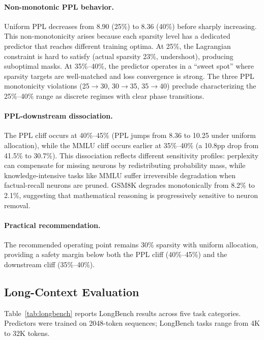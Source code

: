 \documentclass[11pt,a4paper]{article}
\begin{document}
\paragraph{Non-monotonic PPL behavior.} Uniform PPL decreases from 8.90 (25\%) to 8.36 (40\%) before sharply increasing. This non-monotonicity arises because each sparsity level has a dedicated predictor that reaches different training optima. At 25\%, the Lagrangian constraint is hard to satisfy (actual sparsity 23\%, undershoot), producing suboptimal masks. At 35\%--40\%, the predictor operates in a ``sweet spot'' where sparsity targets are well-matched and loss convergence is strong. The three PPL monotonicity violations (25$\to$30, 30$\to$35, 35$\to$40) preclude characterizing the 25\%--40\% range as discrete regimes with clear phase transitions.

\paragraph{PPL-downstream dissociation.} The PPL cliff occurs at 40\%--45\% (PPL jumps from 8.36 to 10.25 under uniform allocation), while the MMLU cliff occurs earlier at 35\%--40\% (a 10.8pp drop from 41.5\% to 30.7\%). This dissociation reflects different sensitivity profiles: perplexity can compensate for missing neurons by redistributing probability mass, while knowledge-intensive tasks like MMLU suffer irreversible degradation when factual-recall neurons are pruned. GSM8K degrades monotonically from 8.2\% to 2.1\%, suggesting that mathematical reasoning is progressively sensitive to neuron removal.

\paragraph{Practical recommendation.} The recommended operating point remains 30\% sparsity with uniform allocation, providing a safety margin below both the PPL cliff (40\%--45\%) and the downstream cliff (35\%--40\%).

\subsection{Long-Context Evaluation}
\label{sec:longbench}

Table~\ref{tab:longbench} reports LongBench results across five task categories. Predictors were trained on 2048-token sequences; LongBench tasks range from 4K to 32K tokens.
\end{document}

